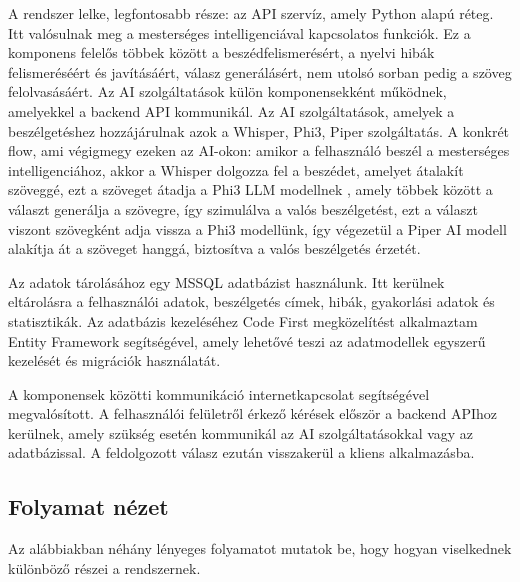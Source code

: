 A rendszer lelke, legfontosabb része: az API szervíz, amely Python alapú réteg. Itt valósulnak meg a mesterséges intelligenciával kapcsolatos funkciók. Ez a komponens felelős többek között a beszédfelismerésért, a nyelvi hibák felismeréséért és javításáért, válasz generálásért, nem utolsó sorban pedig a szöveg felolvasásáért. Az AI szolgáltatások külön komponensekként működnek, amelyekkel a backend API kommunikál. \cite{fowlerMicroservices} Az AI szolgáltatások, amelyek a beszélgetéshez hozzájárulnak azok a Whisper, Phi3, Piper szolgáltatás. A konkrét flow, ami végigmegy ezeken az AI-okon: amikor a felhasználó beszél a mesterséges intelligenciához, akkor a Whisper dolgozza fel a beszédet, amelyet átalakít szöveggé, ezt a szöveget átadja a Phi3 LLM modellnek \cite{whisper,fasterwhisper,phi3,piper}, amely többek között a választ generálja a szövegre, így szimulálva a valós beszélgetést, ezt a választ viszont szövegként adja vissza a Phi3 modellünk, így végezetül a Piper AI modell alakítja át a szöveget hanggá, biztosítva a valós beszélgetés érzetét.

Az adatok tárolásához egy MSSQL adatbázist használunk. Itt kerülnek eltárolásra a felhasználói adatok, beszélgetés címek, hibák, gyakorlási adatok és statisztikák. Az adatbázis kezeléséhez Code First megközelítést alkalmaztam Entity Framework segítségével, amely lehetővé teszi az adatmodellek egyszerű kezelését és migrációk használatát. \cite{efcoreMigrations}

A komponensek közötti kommunikáció internetkapcsolat segítségével megvalósított. A felhasználói felületről érkező kérések először a backend APIhoz kerülnek, amely szükség esetén kommunikál az AI szolgáltatásokkal vagy az adatbázissal. A feldolgozott válasz ezután visszakerül a kliens alkalmazásba.


\subsection{Folyamat nézet}

Az alábbiakban néhány lényeges folyamatot mutatok be, hogy hogyan viselkednek különböző részei a rendszernek.

